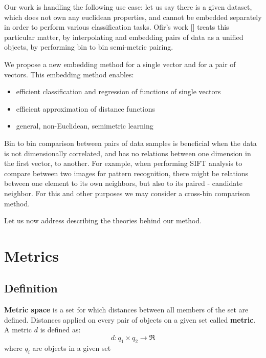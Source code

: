 Our work is handling the following use case: let us say there is a given dataset, which does not own any euclidean properties, and cannot be embedded separately in order to perform various classification tasks. 
Ofir’s work [] treats this particular matter, by interpolating and embedding pairs of data as a unified objects, by performing bin to bin semi-metric pairing.

We propose a new embedding method for a single vector and for a pair
of vectors. This embedding method enables: 
\begin{itemize}[noitemsep]
	\item  efficient classification and regression of functions of single vectors
	\item  efficient approximation of distance functions
	\item  general, non-Euclidean, semimetric learning 
\end{itemize}

Bin to bin comparison between pairs of data samples is beneficial when the data is not dimensionally correlated, and has no relations between one dimension in the first vector, to another. For example, when performing SIFT analysis to compare between two images for pattern recognition, there might be relations between one element to its own neighbors, but also to its paired - candidate neighbor.
For this and other purposes we may consider a cross-bin comparison method.

Let us now address describing the theories behind our method.


\section{Metrics}


\subsection{Definition}

\textbf{Metric space} is a set for which distances between all members of the set are defined. Distances applied on every pair of objects on a given set called \textbf{metric}.
A metric $d$ is defined as:\\
\begin{equation}
d: q_1 \times q_2 \rightarrow \Re
\end{equation}
where $q_i$ are objects in a given set

